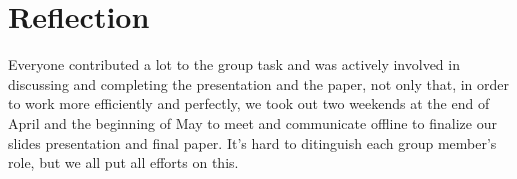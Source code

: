 \section{Reflection}

Everyone contributed a lot to the group task and was actively involved in discussing and completing the presentation and the paper, not only that, in order to work more efficiently and perfectly, we took out two weekends at the end of April and the beginning of May to meet and communicate offline to finalize our slides presentation and final paper. It's hard to ditinguish each group member’s role, but we all put all efforts on this.